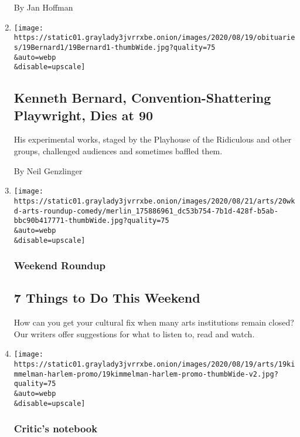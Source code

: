 \begin{enumerate}
  By Jan Hoffman
\item
  \href{/2020/08/20/theater/kenneth-bernard-dead.html}{}

  \texttt{[image: https://static01.graylady3jvrrxbe.onion/images/2020/08/19/obituaries/19Bernard1/19Bernard1-thumbWide.jpg?quality=75\\\&auto=webp\\\&disable=upscale]}

  \hypertarget{kenneth-bernard-convention-shattering-playwright-dies-at-90}{%
  \subsection{Kenneth Bernard, Convention-Shattering Playwright, Dies at
  90}\label{kenneth-bernard-convention-shattering-playwright-dies-at-90}}

  His experimental works, staged by the Playhouse of the Ridiculous and
  other groups, challenged audiences and sometimes baffled them.

  By Neil Genzlinger
\item
  \href{/2020/08/20/arts/things-to-do-weekend-coronavirus.html}{}

  \texttt{[image: https://static01.graylady3jvrrxbe.onion/images/2020/08/21/arts/20wkd-arts-roundup-comedy/merlin\_175886961\_dc53b754-7b1d-428f-b5ab-bbc90b417771-thumbWide.jpg?quality=75\\\&auto=webp\\\&disable=upscale]}

  \hypertarget{weekend-roundup}{%
  \subsubsection{Weekend Roundup}\label{weekend-roundup}}

  \hypertarget{7-things-to-do-this-weekend}{%
  \subsection{7 Things to Do This
  Weekend}\label{7-things-to-do-this-weekend}}

  How can you get your cultural fix when many arts institutions remain
  closed? Our writers offer suggestions for what to listen to, read and
  watch.
\item
  \href{/2020/08/20/arts/design/harlem-virtual-tour.html}{}

  \texttt{[image: https://static01.graylady3jvrrxbe.onion/images/2020/08/19/arts/19kimmelman-harlem-promo/19kimmelman-harlem-promo-thumbWide-v2.jpg?quality=75\\\&auto=webp\\\&disable=upscale]}

  \hypertarget{critics-notebook}{%
  \subsubsection{Critic's notebook}\label{critics-notebook}}


\end{enumerate}
